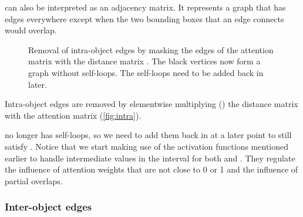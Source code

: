 \documentclass[letterpaper]{article}
\begin{document}
 can also be interpreted as an adjacency matrix.
It represents a graph that has edges everywhere except when the two bounding boxes that an edge connects would overlap.

\begin{figure}
    \centering
    \caption{
        Removal of intra-object edges by masking the edges of the attention matrix  with the distance matrix .
        The black vertices now form a graph without self-loops.
        The self-loops need to be added back in later.
    }
    \label{fig:intra}
\end{figure}

Intra-object edges are removed by elementwise multiplying () the distance matrix with the attention matrix (\autoref{fig:intra}).



 no longer has self-loops, so we need to add them back in at a later point to still satisfy .
Notice that we start making use of the activation functions mentioned earlier to handle intermediate values in the interval  for both  and .
They regulate the influence of attention weights that are not close to 0 or 1 and the influence of partial overlaps.

\subsubsection{Inter-object edges}
\end{document}
